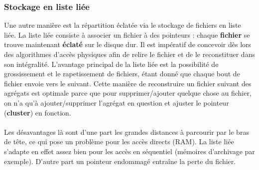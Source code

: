 \documentclass[12pt,a4paper]{report}
\begin{document}
\subsubsection{Stockage en liste liée}
 Une autre manière est la répartition éclatée via le stockage de fichiers en liste liée. La liste liée consiste à associer un fichier à des pointeurs : chaque \textbf{fichier} se trouve maintenant \textbf{éclaté} sur le disque dur. Il est impératif de concevoir dès lors des algorithmes d'accès physiques afin de relire le fichier et de le reconstituer dans son intégralité. L'avantage principal de la liste liée est la possibilité de grossissement et le rapetissement de fichiers, étant donné que chaque bout de fichier envoie vers le suivant. Cette manière de reconstruire un fichier suivant des agrégats est optimale parce que pour supprimer/ajouter quelque chose au fichier, on n'a qu'à ajouter/supprimer l'agrégat en question et ajuster le pointeur (\textbf{cluster}) en fonction. \\
  \\
Les désavantages là sont d'une part les grandes distances à parcourir par le bras de tête, ce qui pose un problème pour les accès directs (RAM). La liste liée s'adapte en effet assez bien pour les accès en séquentiel (mémoires d'archivage par exemple). D'autre part un pointeur endommagé entraîne la perte du fichier. 
\end{document}

